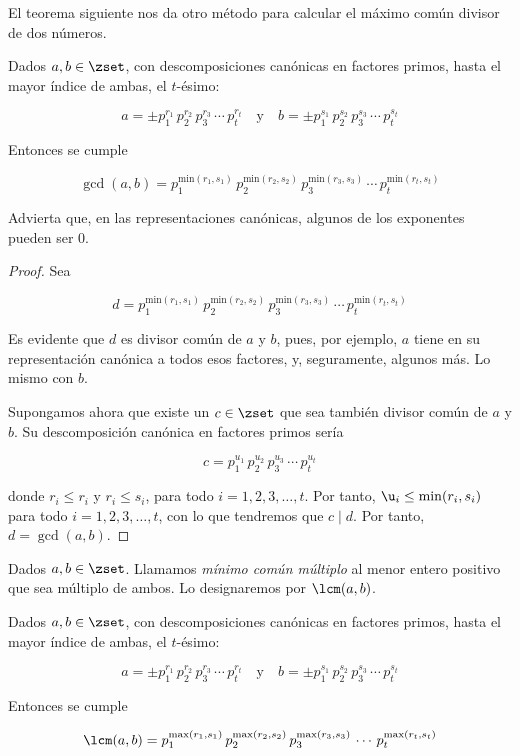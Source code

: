 El teorema siguiente nos da otro método para calcular el máximo común
divisor de dos números.

\begin{theorem}
  Dados $a, b \in \zset$, con descomposiciones canónicas en factores primos,
  hasta el mayor índice de ambas, el $t$-ésimo:

  $$ a = \pm p_1^{r_1} \, p_2^{r_2} \, p_3^{r_3} \, \cdots \, p_t^{r_t}
  \quad \text{y} \quad b = \pm p_1^{s_1} \, p_2^{s_2} \, p_3^{s_3} \, \cdots
  \, p_t^{s_t} $$

  \noindent Entonces se cumple

  $$ \gcd(a, b) = p_1^{\mathrm{min}(r_1, s_1)} \, p_2^{\mathrm{min}(r_2,
  s_2)} \, p_3^{\mathrm{min}(r_3, s_3)} \, \cdots \, p_t^{\mathrm{min}(r_t,
  s_t)} $$
\end{theorem}

Advierta que, en las representaciones canónicas, algunos de los exponentes
pueden ser 0.

\begin{proof}
  Sea

  $$ d = p_1^{\mathrm{min}(r_1, s_1)} \, p_2^{\mathrm{min}(r_2, s_2)} \,
  p_3^{\mathrm{min}(r_3, s_3)} \, \cdots \, p_t^{\mathrm{min}(r_t, s_t)} $$

  Es evidente que $d$ es divisor común de $a$ y $b$, pues, por ejemplo, $a$
  tiene en su representación canónica a todos esos factores, y, seguramente,
  algunos más. Lo mismo con $b$.

  Supongamos ahora que existe un $c \in \zset$ que sea también divisor común
  de $a$ y $b$. Su descomposición canónica en factores primos sería

  $$ c = p_1^{u_1} \, p_2^{u_2} \, p_3^{u_3} \, \cdots \, p_t^{u_t} $$

  \noindent donde $r_i \leq r_i$ y $r_i \leq s_i$, para todo $i = 1, 2, 3,
  \ldots, t$. Por tanto, $\u_i \leq \mathrm{min}(r_i, s_i)$ para todo $i =
  1, 2, 3, \ldots, t$, con lo que tendremos que $c \mid d$. Por tanto, $d =
  \gcd(a, b)$.
\end{proof}


\begin{deffinition}
  Dados $a, b \in \zset$. Llamamos \emph{mínimo común múltiplo} al menor entero
  positivo que sea múltiplo de ambos. Lo designaremos por $\lcm(a, b)$.
\end{deffinition}

\begin{theorem}
  Dados $a, b \in \zset$, con descomposiciones canónicas en factores primos,
  hasta el mayor índice de ambas, el $t$-ésimo:

  $$ a = \pm p_1^{r_1} \, p_2^{r_2} \, p_3^{r_3} \, \cdots \, p_t^{r_t}
  \quad \text{y} \quad b = \pm p_1^{s_1} \, p_2^{s_2} \, p_3^{s_3} \, \cdots
  \, p_t^{s_t} $$

  \noindent Entonces se cumple

  $$ \lcm(a, b) = p_1^{\mathrm{max}(r_1, s_1)} \, p_2^{\mathrm{max}(r_2,
  s_2)} \, p_3^{\mathrm{max}(r_3, s_3)} \, \cdots \, p_t^{\mathrm{max}(r_t,
  s_t)} $$
\end{theorem}

